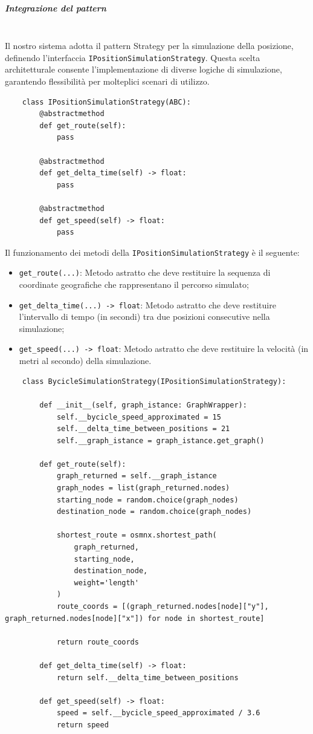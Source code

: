 \documentclass[10pt]{article}
\newcommand{\mysubparagraph}[1]{\subparagraph{#1}\mbox{}\\}
\begin{document}
    \mysubparagraph{Integrazione del pattern}
    Il nostro sistema adotta il pattern Strategy per la simulazione della posizione, definendo l'interfaccia \texttt{IPositionSimulationStrategy}. Questa scelta architetturale consente l'implementazione di diverse logiche di simulazione, garantendo flessibilità per molteplici scenari di utilizzo.
    \begin{lstlisting}
    class IPositionSimulationStrategy(ABC):
        @abstractmethod
        def get_route(self):
            pass

        @abstractmethod
        def get_delta_time(self) -> float:
            pass

        @abstractmethod
        def get_speed(self) -> float:
            pass
    \end{lstlisting}
    Il funzionamento dei metodi della \texttt{IPositionSimulationStrategy} è il seguente:
    \begin{itemize}
        \item \texttt{get\_route(...)}: Metodo astratto che deve restituire la sequenza di coordinate geografiche che rappresentano il percorso simulato;
        \item \texttt{get\_delta\_time(...) -> float}: Metodo astratto che deve restituire l'intervallo di tempo (in secondi) tra due posizioni consecutive nella simulazione;
        \item \texttt{get\_speed(...) -> float}: Metodo astratto che deve restituire la velocità (in metri al secondo) della simulazione.
    \end{itemize}
    \begin{lstlisting}
    class BycicleSimulationStrategy(IPositionSimulationStrategy):

        def __init__(self, graph_istance: GraphWrapper):
            self.__bycicle_speed_approximated = 15
            self.__delta_time_between_positions = 21
            self.__graph_istance = graph_istance.get_graph()

        def get_route(self):
            graph_returned = self.__graph_istance
            graph_nodes = list(graph_returned.nodes)
            starting_node = random.choice(graph_nodes)
            destination_node = random.choice(graph_nodes)

            shortest_route = osmnx.shortest_path(
                graph_returned,
                starting_node,
                destination_node,
                weight='length'
            )
            route_coords = [(graph_returned.nodes[node]["y"], graph_returned.nodes[node]["x"]) for node in shortest_route]

            return route_coords

        def get_delta_time(self) -> float:
            return self.__delta_time_between_positions

        def get_speed(self) -> float:
            speed = self.__bycicle_speed_approximated / 3.6
            return speed
    \end{lstlisting}
\end{document}
